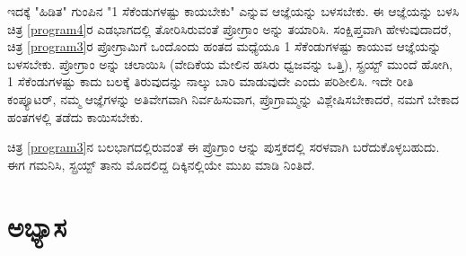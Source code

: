 ಇದಕ್ಕೆ "ಹಿಡಿತ" ಗುಂಪಿನ "1 ಸೆಕೆಂಡುಗಳಷ್ಟು   ಕಾಯಬೇಕು" ಎನ್ನುವ ಆಜ್ಞೆಯನ್ನು ಬಳಸಬೇಕು.  ಈ ಆಜ್ಞೆಯನ್ನು ಬಳಸಿ ಚಿತ್ರ \ref{program4}ರ ಎಡಭಾಗದಲ್ಲಿ ತೋರಿಸಿರುವಂತೆ ಪ್ರೋಗ್ರಾಂ ಅನ್ನು ತಯಾರಿಸಿ.  ಸಂಕ್ಷಿಪ್ತವಾಗಿ ಹೇಳುವುದಾದರೆ, ಚಿತ್ರ \ref{program3}ರ ಪ್ರೋಗ್ರಾಮಿಗೆ ಒಂದೊಂದು ಹಂತದ ಮಧ್ಯೆಯೂ 1 ಸೆಕೆಂಡುಗಳಷ್ಟು   ಕಾಯುವ ಆಜ್ಞೆಯನ್ನು ಬಳಸಬೇಕು.  ಪ್ರೋಗ್ರಾಂ ಅನ್ನು  ಚಲಾಯಿಸಿ (ವೇದಿಕೆಯ ಮೇಲಿನ ಹಸಿರು ಧ್ವಜವನ್ನು ಒತ್ತಿ),  ಸ್ಪ್ರಯ್ಟ್ ಮುಂದೆ ಹೋಗಿ, 1 ಸೆಕೆಂಡುಗಳಷ್ಟು ಕಾದು ಬಲಕ್ಕೆ ತಿರುವುದನ್ನು ನಾಲ್ಕು ಬಾರಿ ಮಾಡುವುದೇ ಎಂದು ಪರಿಶೀಲಿಸಿ.  ಇದೇ ರೀತಿ ಕಂಪ್ಯೂಟರ್, ನಮ್ಮ ಆಜ್ಞೆಗಳನ್ನು ಅತಿವೇಗವಾಗಿ ನಿರ್ವಹಿಸುವಾಗ, ಪ್ರೊಗ್ರಾಮ್ಮನ್ನು ವಿಶ್ಲೇಷಿಸಬೇಕಾದರೆ,  ನಮಗೆ ಬೇಕಾದ ಹಂತಗಳಲ್ಲಿ ತಡೆದು ಕಾಯಿಸಬೇಕು.

ಚಿತ್ರ \ref{program3}ನ ಬಲಭಾಗದಲ್ಲಿರುವಂತೆ  ಈ ಪ್ರೊಗ್ರಾಂ ಆನ್ನು ಪುಸ್ತಕದಲ್ಲಿ  ಸರಳವಾಗಿ ಬರೆದುಕೊಳ್ಳಬಹುದು.   ಈಗ ಗಮನಿಸಿ, ಸ್ಪ್ರಯ್ಟ್  ತಾನು ಮೊದಲಿದ್ದ ದಿಕ್ಕಿನಲ್ಲಿಯೇ ಮುಖ ಮಾಡಿ ನಿಂತಿದೆ. 

\section{ಅಭ್ಯಾಸ }
